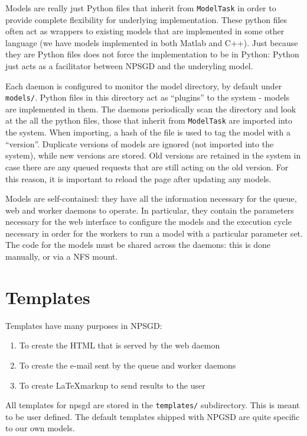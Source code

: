 \documentclass{article}
\newcommand{\mpath}[1]{\texttt{#1}}
\newcommand{\mclass}[1]{\texttt{#1}}
\begin{document}
Models are really just Python files that inherit from \mclass{ModelTask} in
order to provide complete flexibility for underlying implementation. These
python files often act as wrappers to existing models that are implemented in
some other language (we have models implemented in both Matlab and C++). Just
because they are Python files does not force the implementation to be in Python:
Python just acts as a facilitator between NPSGD and the underyling model. 

Each daemon is configured to monitor the model directory, by default under
\mpath{models/}. Python files in this directory act as ``plugins'' to the system
- models are implemented in them. The daemons periodically scan the directory
and look at the all the python files, those that inherit from \mclass{ModelTask}
are imported into the system. When importing, a hash of the file is used to tag
the model with a ``version''. Duplicate versions of models are ignored (not
imported into the system), while new versions are stored. Old versions are
retained in the system in case there are any queued requests that are still
acting on the old version. For this reason, it is important to reload the page
after updating any models.

Models are self-contained: they have all the information necessary for the
queue, web and worker daemons to operate. In particular, they contain the
parameters necessary for the web interface to configure the models and the
execution cycle necessary in order for the workers to run a model with a
particular parameter set. The code for the models must be shared
across the daemons: this is done manually, or via a NFS mount.

\section{Templates}
Templates have many purposes in NPSGD:
\begin{enumerate}
    \item To create the HTML that is served by the web daemon
    \item To create the e-mail sent by the queue and worker daemons
    \item To create \LaTeX markup to send results to the user
\end{enumerate}

All templates for npsgd are stored in the \mpath{templates/} subdirectory. This
is meant to be user defined. The default templates shipped with NPGSD are quite
specific to our own models.
\end{document}

